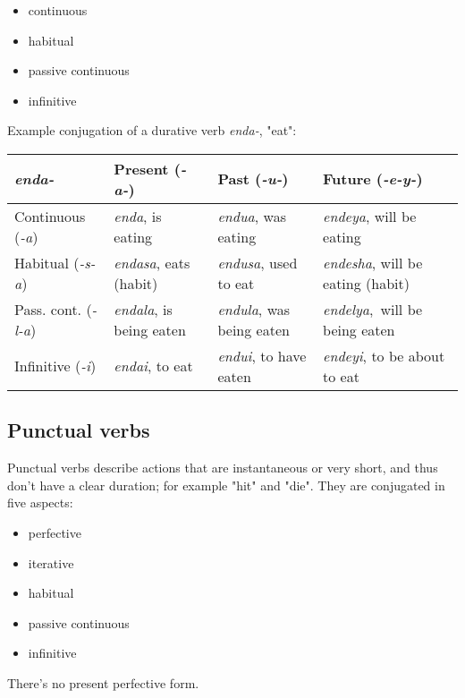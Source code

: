 \begin{itemize}
	\item continuous
	\item habitual
	\item passive continuous
	\item infinitive
\end{itemize}

Example conjugation of a durative verb \emph{enda-}, "eat":

\begin{table}[H]
\begin{tabular}{ l|l|l|l }
	\emph{enda-}              & Present (\emph{-a-})          & Past (\emph{-u-})              & Future (\emph{-e-y-})                  \\
	\hline
	Continuous (\emph{-a})    & \emph{enda}, is eating        & \emph{endua}, was eating       & \emph{endeya}, will be eating          \\
	Habitual (\emph{-s-a})    & \emph{endasa}, eats (habit)   & \emph{endusa}, used to eat     & \emph{endesha}, will be eating (habit) \\
	Pass. cont. (\emph{-l-a}) & \emph{endala}, is being eaten & \emph{endula}, was being eaten & \emph{endelya}, will be being eaten    \\
	Infinitive (\emph{-i})    & \emph{endai}, to eat          & \emph{endui}, to have eaten    & \emph{endeyi}, to be about to eat      \\
\end{tabular}
\end{table}

\subsection{Punctual verbs}

Punctual verbs describe actions that are instantaneous or very short, and thus
don't have a clear duration; for example "hit" and "die". They are conjugated in
five aspects:

\begin{itemize}
	\item perfective
	\item iterative
	\item habitual
	\item passive continuous
	\item infinitive
\end{itemize}

There's no present perfective form.

